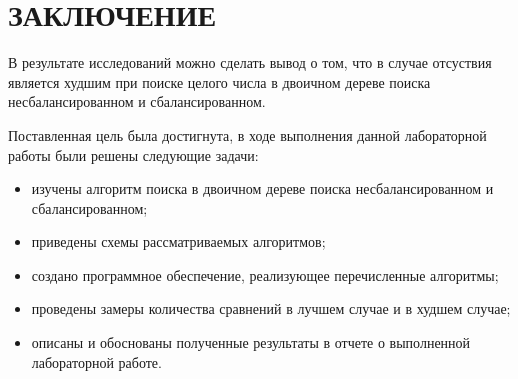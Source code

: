 \chapter*{{\hfill{\centering ЗАКЛЮЧЕНИЕ}\hfill}}

В результате исследований можно сделать вывод о том, что в случае отсуствия является худшим при поиске целого числа в двоичном дереве поиска несбалансированном и сбалансированном.

Поставленная цель была достигнута, в ходе выполнения данной лабораторной работы были решены следующие задачи:
\begin{itemize}[label=---]
	\item изучены алгоритм поиска в двоичном дереве поиска несбалансированном и сбалансированном;
	\item приведены схемы рассматриваемых алгоритмов;
	\item создано программное обеспечение, реализующее перечисленные алгоритмы;
	\item проведены замеры количества сравнений в лучшем случае и в худшем случае;
	\item описаны и обоснованы полученные результаты в отчете о выполненной лабораторной работе.
\end{itemize}
